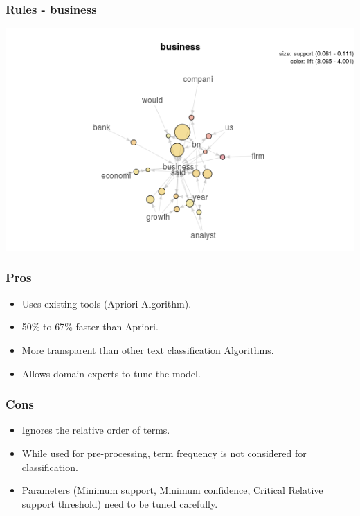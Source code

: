 \documentclass{beamer}
\begin{document}
	\begin{frame}
			\frametitle{Rules - business}
			\begin{center}
				\includegraphics[scale=0.55]{business.png}
			\end{center}
	\end{frame}
	
	\begin{frame}
			\frametitle{Pros}
			\begin {itemize}
			\item Uses existing tools (Apriori Algorithm). 
			\item 50\% to 67\% faster than Apriori.
			\item More transparent than other text classification Algorithms.
			\item Allows domain experts to tune the model.
			\end {itemize}
			
	\end{frame}
	
	\begin {frame}
	\frametitle{Cons}
	\begin {itemize}
			\item Ignores the relative order of terms.
			\item While used for pre-processing, term frequency is not considered for classification.
			\item Parameters (Minimum support, Minimum confidence, Critical Relative support threshold) need to be tuned carefully.
			\end {itemize}
	\end {frame}
\end{document}
